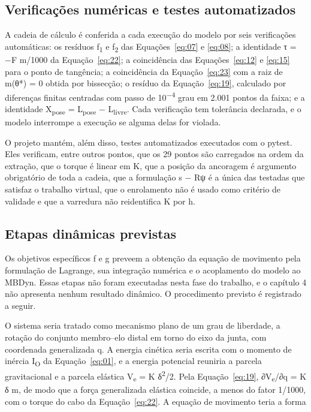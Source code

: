 \subsection{Verificações numéricas e testes automatizados}\label{sec:3.1.12}

A cadeia de cálculo é conferida a cada execução do modelo por seis verificações automáticas: os resíduos f\textsubscript{1} e f\textsubscript{2} das Equações~\eqref{eq:07} e \eqref{eq:08}; a identidade τ = −F m/1000 da Equação~\eqref{eq:22}; a coincidência das Equações~\eqref{eq:12} e \eqref{eq:15} para o ponto de tangência; a coincidência da Equação~\eqref{eq:23} com a raiz de m(θ*) = 0 obtida por bissecção; o resíduo da Equação~\eqref{eq:19}, calculado por diferenças finitas centradas com passo de 10\textsuperscript{−4} grau em 2.001 pontos da faixa; e a identidade X\textsubscript{pose} = L\textsubscript{pose} − L\textsubscript{livre}. Cada verificação tem tolerância declarada, e o modelo interrompe a execução se alguma delas for violada.

O projeto mantém, além disso, testes automatizados executados com o pytest. Eles verificam, entre outros pontos, que os 29 pontos são carregados na ordem da extração, que o torque é linear em K, que a posição da ancoragem é argumento obrigatório de toda a cadeia, que a formulação s − Rψ é a única das testadas que satisfaz o trabalho virtual, que o enrolamento não é usado como critério de validade e que a varredura não reidentifica K por h.

\subsection{Etapas dinâmicas previstas}\label{sec:3.1.13}

Os objetivos específicos f e g preveem a obtenção da equação de movimento pela formulação de Lagrange, sua integração numérica e o acoplamento do modelo ao MBDyn. Essas etapas não foram executadas nesta fase do trabalho, e o capítulo 4 não apresenta nenhum resultado dinâmico. O procedimento previsto é registrado a seguir.

O sistema seria tratado como mecanismo plano de um grau de liberdade, a rotação do conjunto membro–elo distal em torno do eixo da junta, com coordenada generalizada q. A energia cinética seria escrita com o momento de inércia I\textsubscript{O} da Equação~\eqref{eq:01}, e a energia potencial reuniria a parcela gravitacional e a parcela elástica V\textsubscript{e} = K δ\textsuperscript{2}/2. Pela Equação~\eqref{eq:19}, ∂V\textsubscript{e}/∂q = K δ m, de modo que a força generalizada elástica coincide, a menos do fator 1/1000, com o torque do cabo da Equação~\eqref{eq:22}. A equação de movimento teria a forma

